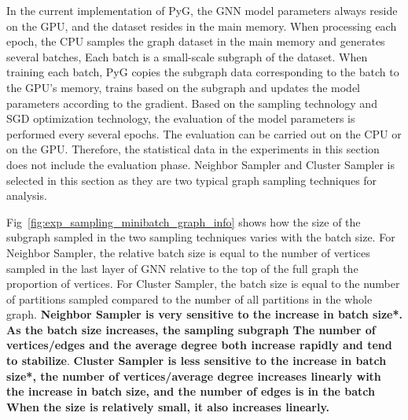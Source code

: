 In the current implementation of PyG, the GNN model parameters always reside on the GPU,
and the dataset resides in the main memory. When processing each epoch, the CPU samples
the graph dataset in the main memory and generates several batches,
Each batch is a small-scale subgraph of the dataset. When training each batch, 
PyG copies the subgraph data corresponding to the batch to the GPU's memory,
trains based on the subgraph and updates the model parameters according to the gradient.
Based on the sampling technology and SGD optimization technology, 
the evaluation of the model parameters is performed every several epochs. 
The evaluation can be carried out on the CPU or on the GPU. 
Therefore, the statistical data in the experiments in this section does not include the evaluation phase. 
Neighbor Sampler and Cluster Sampler is selected in this section as they are two typical graph sampling techniques for analysis.

Fig~\ref{fig:exp_sampling_minibatch_graph_info} shows how the size of the subgraph sampled in the two sampling techniques varies with the batch size.
For Neighbor Sampler, the relative batch size is equal to the number of vertices sampled in the last layer of GNN relative to the top of the full graph the proportion of vertices.
For Cluster Sampler, the batch size is equal to the number of partitions sampled compared to the number of all partitions in the whole graph.
\textbf{Neighbor Sampler is very sensitive to the increase in batch size*. As the batch size increases, 
the sampling subgraph The number of vertices/edges and the average degree both increase rapidly and tend to stabilize}.
\textbf{Cluster Sampler is less sensitive to the increase in batch size*, the number of vertices/average degree increases
linearly with the increase in batch size, and the number of edges is in the batch When the size is relatively small,
it also increases linearly.}

